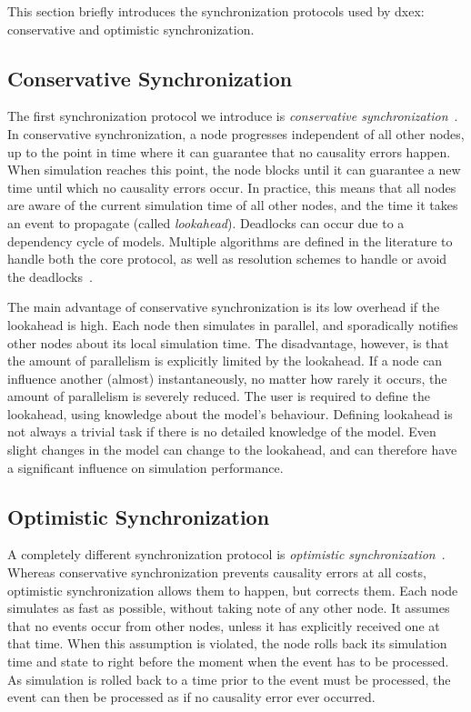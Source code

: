 This section briefly introduces the synchronization protocols used by dxex: conservative and optimistic synchronization.

\subsection{Conservative Synchronization}
The first synchronization protocol we introduce is \textit{conservative synchronization}~\cite{FujimotoBook}.
In conservative synchronization, a node progresses independent of all other nodes, up to the point in time where it can guarantee that no causality errors happen.
When simulation reaches this point, the node blocks until it can guarantee a new time until which no causality errors occur.
In practice, this means that all nodes are aware of the current simulation time of all other nodes, and the time it takes an event to propagate (called \textit{lookahead}).
Deadlocks can occur due to a dependency cycle of models.
Multiple algorithms are defined in the literature to handle both the core protocol, as well as resolution schemes to handle or avoid the deadlocks~\cite{FujimotoBook}.

The main advantage of conservative synchronization is its low overhead if the lookahead is high.
Each node then simulates in parallel, and sporadically notifies other nodes about its local simulation time.
The disadvantage, however, is that the amount of parallelism is explicitly limited by the lookahead.
If a node can influence another (almost) instantaneously, no matter how rarely it occurs, the amount of parallelism is severely reduced.
The user is required to define the lookahead, using knowledge about the model's behaviour.
Defining lookahead is not always a trivial task if there is no detailed knowledge of the model.
Even slight changes in the model can change to the lookahead, and can therefore have a significant influence on simulation performance.

\subsection{Optimistic Synchronization}
A completely different synchronization protocol is \textit{optimistic synchronization}~\cite{TimeWarp}.
Whereas conservative synchronization prevents causality errors at all costs, optimistic synchronization allows them to happen, but corrects them.
Each node simulates as fast as possible, without taking note of any other node.
It assumes that no events occur from other nodes, unless it has explicitly received one at that time.
When this assumption is violated, the node rolls back its simulation time and state to right before the moment when the event has to be processed.
As simulation is rolled back to a time prior to the event must be processed, the event can then be processed as if no causality error ever occurred.

